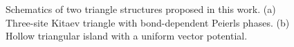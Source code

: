 \documentclass[aps,prb,showpacs,amsmath,twocolumn,amssymb,superscriptaddress]{revtex4-2}
\begin{document}
\begin{figure}[ht]
  \hspace{-18pt}
  \caption{Schematics of two triangle structures proposed in this work. (a) Three-site Kitaev triangle with bond-dependent Peierls phases. (b) Hollow triangular island with a uniform vector potential.}
  \label{fig:triangles}
\end{figure}
\end{document}
